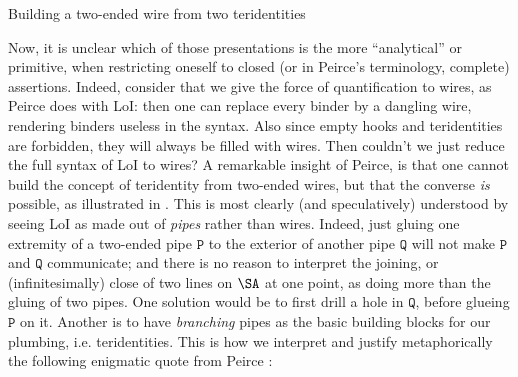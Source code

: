 \begin{scope}
\begin{marginfigure}
  \begin{center}
  \end{center}
  \caption{Building a two-ended wire from two teridentities}
\end{marginfigure}

Now, it is unclear which of those presentations is the more ``analytical'' or
primitive, when restricting oneself to closed (or in Peirce's terminology,
complete) assertions. Indeed, consider that we give the force of quantification
to wires, as Peirce does with LoI: then one can replace every binder by a
dangling wire, rendering binders useless in the syntax. Also since empty hooks
and teridentities are forbidden, they will always be filled with wires. Then
couldn't we just reduce the full syntax of LoI to wires? A remarkable insight of
Peirce, is that one cannot build the concept of teridentity from two-ended
wires, but that the converse \emph{is} possible, as illustrated in
. This is most clearly (and speculatively) understood
by seeing LoI as made out of \emph{pipes} rather than wires. Indeed, just gluing
one extremity of a two-ended pipe $\mathtt{P}$ to the exterior of another pipe
$\mathtt{Q}$ will not make $\mathtt{P}$ and $\mathtt{Q}$ communicate; and there
is no reason to interpret the joining, or (infinitesimally) close 
of two lines on $\SA$ at one point, as doing more than the gluing of two
pipes. One
solution would be to first drill a hole in $\mathtt{Q}$, before glueing
$\mathtt{P}$ on it. Another is to have \emph{branching} pipes as the basic
building blocks for our plumbing, i.e. teridentities. This is how we interpret
and justify metaphorically the following enigmatic quote from Peirce
\cite[p.~116]{Roberts+1973}:


\end{scope}
